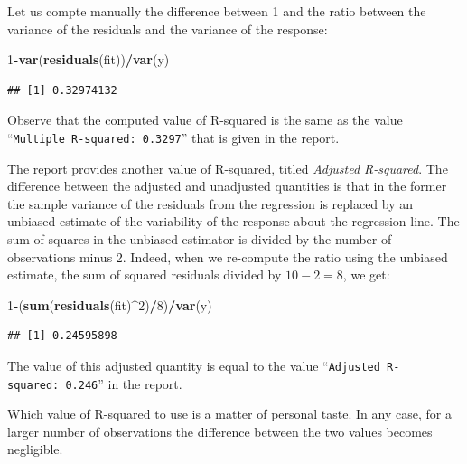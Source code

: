 \documentclass[]{krantz}
\makeatletter
\newenvironment{Shaded}{\begin{snugshade}}{\end{snugshade}}
\newcommand{\KeywordTok}[1]{\textcolor[rgb]{0.13,0.29,0.53}{\textbf{#1}}}
\newcommand{\DecValTok}[1]{\textcolor[rgb]{0.00,0.00,0.81}{#1}}
\newcommand{\OperatorTok}[1]{\textcolor[rgb]{0.81,0.36,0.00}{\textbf{#1}}}
\newcommand{\NormalTok}[1]{#1}
\newenvironment{kframe}{%
\medskip{}
\setlength{\fboxsep}{.8em}
 \def\at@end@of@kframe{}%
 \ifinner\ifhmode%
  \def\at@end@of@kframe{\end{minipage}}%
  \begin{minipage}{\columnwidth}%
 \fi\fi%
 \def\FrameCommand##1{\hskip\@totalleftmargin \hskip-\fboxsep
 \colorbox{shadecolor}{##1}\hskip-\fboxsep
     \hskip-\linewidth \hskip-\@totalleftmargin \hskip\columnwidth}%
 \MakeFramed {\advance\hsize-\width
   \@totalleftmargin\z@ \linewidth\hsize
   \@setminipage}}%
 {\par\unskip\endMakeFramed%
 \at@end@of@kframe}
\renewenvironment{Shaded}{\begin{kframe}}{\end{kframe}}
\theoremstyle{definition}
\theoremstyle{definition}
\theoremstyle{definition}
\theoremstyle{remark}
\makeatother
\begin{document}
Let us compte manually the difference between 1 and the ratio between
the variance of the residuals and the variance of the response:

\begin{Shaded}
\begin{Highlighting}[]
\DecValTok{1}\OperatorTok{-}\KeywordTok{var}\NormalTok{(}\KeywordTok{residuals}\NormalTok{(fit))}\OperatorTok{/}\KeywordTok{var}\NormalTok{(y)}
\end{Highlighting}
\end{Shaded}

\begin{verbatim}
## [1] 0.32974132
\end{verbatim}

Observe that the computed value of R-squared is the same as the value
``\texttt{Multiple\ R-squared:\ 0.3297}'' that is given in the report.

The report provides another value of R-squared, titled \emph{Adjusted
R-squared}. The difference between the adjusted and unadjusted
quantities is that in the former the sample variance of the residuals
from the regression is replaced by an unbiased estimate of the
variability of the response about the regression line. The sum of
squares in the unbiased estimator is divided by the number of
observations minus 2. Indeed, when we re-compute the ratio using the
unbiased estimate, the sum of squared residuals divided by
\(10 - 2 = 8\), we get:

\begin{Shaded}
\begin{Highlighting}[]
\DecValTok{1}\OperatorTok{-}\NormalTok{(}\KeywordTok{sum}\NormalTok{(}\KeywordTok{residuals}\NormalTok{(fit)}\OperatorTok{^}\DecValTok{2}\NormalTok{)}\OperatorTok{/}\DecValTok{8}\NormalTok{)}\OperatorTok{/}\KeywordTok{var}\NormalTok{(y)}
\end{Highlighting}
\end{Shaded}

\begin{verbatim}
## [1] 0.24595898
\end{verbatim}

The value of this adjusted quantity is equal to the value
``\texttt{Adjusted\ R-squared:\ 0.246}'' in the report.

Which value of R-squared to use is a matter of personal taste. In any
case, for a larger number of observations the difference between the two
values becomes negligible.
\end{document}
